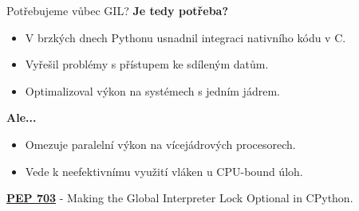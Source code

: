 \documentclass{beamer}
\begin{document}
\begin{frame}{Potřebujeme vůbec GIL?}
	\textbf{Je tedy potřeba?}
	\begin{itemize}
		\item V brzkých dnech Pythonu usnadnil integraci nativního kódu v C.
		\item Vyřešil problémy s přístupem ke sdíleným datům.
		\item Optimalizoval výkon na systémech s jedním jádrem.
	\end{itemize}
	\textbf{Ale...}
	\begin{itemize}
		\item Omezuje paralelní výkon na vícejádrových procesorech.
		\item Vede k neefektivnímu využití vláken u CPU-bound úloh.
	\end{itemize}
	\textbf{\hypersetup{urlcolor=blue} \href{https://peps.python.org/pep-0703/}{PEP 703}} - Making the Global Interpreter Lock Optional in CPython.
\end{frame}


\end{document}
